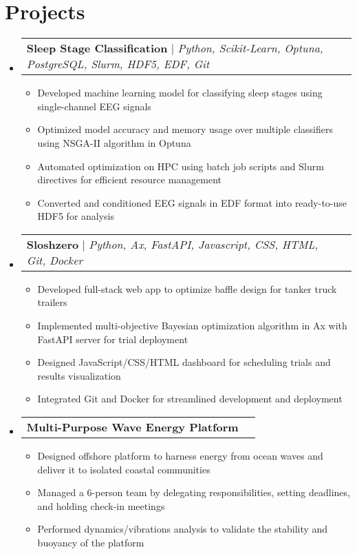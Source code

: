 \documentclass[letterpaper,11pt]{article}
\makeatletter
\newcommand{\resumeItem}[1]{
  \item\small{
    {#1 \vspace{-2pt}}
  }
}
\newcommand{\resumeProjectHeading}[1]{
    \item
    \begin{tabular*}{0.97\textwidth}{l@{\extracolsep{\fill}}r}
      \small#1 \\
    \end{tabular*}\vspace{-7pt}
}
\newcommand{\resumeSubHeadingListStart}{\begin{itemize}[leftmargin=0.15in, label={}]}
\newcommand{\resumeSubHeadingListEnd}{\end{itemize}}
\newcommand{\resumeItemListStart}{\begin{itemize}}
\newcommand{\resumeItemListEnd}{\end{itemize}\vspace{-5pt}}
\makeatother
\begin{document}
\section{Projects}
    \resumeSubHeadingListStart
      \resumeProjectHeading
          {\textbf{Sleep Stage Classification} $|$ \emph{Python, Scikit-Learn, Optuna, PostgreSQL, Slurm, HDF5, EDF, Git}}
          \resumeItemListStart
            \resumeItem{Developed machine learning model for classifying sleep stages using single-channel EEG signals}
            \resumeItem{Optimized model accuracy and memory usage over multiple classifiers using NSGA-II algorithm in Optuna}
            \resumeItem{Automated optimization on HPC using batch job scripts and Slurm directives for efficient resource management}
            \resumeItem{Converted and conditioned EEG signals in EDF format into ready-to-use HDF5 for analysis}
          \resumeItemListEnd
      \resumeProjectHeading
          {\textbf{Sloshzero} $|$ \emph{Python, Ax, FastAPI, Javascript, CSS, HTML, Git, Docker}}
          \resumeItemListStart
            \resumeItem{Developed full-stack web app to optimize baffle design for tanker truck trailers}
            \resumeItem{Implemented multi-objective Bayesian optimization algorithm in Ax with FastAPI server for trial deployment}
            \resumeItem{Designed JavaScript/CSS/HTML dashboard for scheduling trials and results visualization}
            \resumeItem{Integrated Git and Docker for streamlined development and deployment}
          \resumeItemListEnd
      \resumeProjectHeading
          {\textbf{Multi-Purpose Wave Energy Platform}}
          \resumeItemListStart
            \resumeItem{Designed offshore platform to harness energy from ocean waves and deliver it to isolated coastal communities}
            \resumeItem{Managed a 6-person team by delegating responsibilities, setting deadlines, and holding check-in meetings}
            \resumeItem{Performed dynamics/vibrations analysis to validate the stability and buoyancy of the platform}
          \resumeItemListEnd
    \resumeSubHeadingListEnd



%
\end{document}
